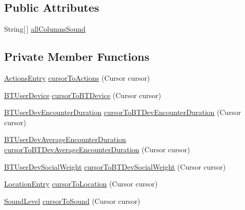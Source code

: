 \subsection*{Public Attributes}
\begin{DoxyCompactItemize}
\item 
String\mbox{[}$\,$\mbox{]} \hyperlink{classcs_1_1nsense_1_1db_1_1_n_sense_data_source_a512871cef56b7d4613d79f722aa60593}{all\-Columns\-Sound}
\end{DoxyCompactItemize}
\subsection*{Private Member Functions}
\begin{DoxyCompactItemize}
\item 
\hyperlink{classcs_1_1nsense_1_1accelerometer_1_1_actions_entry}{Actions\-Entry} \hyperlink{classcs_1_1nsense_1_1db_1_1_n_sense_data_source_ad9a688659c808f6f0772d9b95fd4eb95}{cursor\-To\-Actions} (Cursor cursor)
\item 
\hyperlink{classcs_1_1nsense_1_1bluetooth_1_1_b_t_user_device}{B\-T\-User\-Device} \hyperlink{classcs_1_1nsense_1_1db_1_1_n_sense_data_source_a4e859b85a3b76c52e6d762ad37f96908}{cursor\-To\-B\-T\-Device} (Cursor cursor)
\item 
\hyperlink{classcs_1_1nsense_1_1bluetooth_1_1_b_t_user_dev_encounter_duration}{B\-T\-User\-Dev\-Encounter\-Duration} \hyperlink{classcs_1_1nsense_1_1db_1_1_n_sense_data_source_a9a80fa17315786a5c02e202078322b95}{cursor\-To\-B\-T\-Dev\-Encounter\-Duration} (Cursor cursor)
\item 
\hyperlink{classcs_1_1nsense_1_1bluetooth_1_1_b_t_user_dev_average_encounter_duration}{B\-T\-User\-Dev\-Average\-Encounter\-Duration} \hyperlink{classcs_1_1nsense_1_1db_1_1_n_sense_data_source_a3652b86f815d0f9571dac1cc500164b0}{cursor\-To\-B\-T\-Dev\-Average\-Encounter\-Duration} (Cursor cursor)
\item 
\hyperlink{classcs_1_1nsense_1_1bluetooth_1_1_b_t_user_dev_social_weight}{B\-T\-User\-Dev\-Social\-Weight} \hyperlink{classcs_1_1nsense_1_1db_1_1_n_sense_data_source_a2e2b5c2b588600480bf06f274a7ab6d3}{cursor\-To\-B\-T\-Dev\-Social\-Weight} (Cursor cursor)
\item 
\hyperlink{classcs_1_1nsense_1_1location_1_1_location_entry}{Location\-Entry} \hyperlink{classcs_1_1nsense_1_1db_1_1_n_sense_data_source_a2a2d822324aea74a085b9c1ff44be57c}{cursor\-To\-Location} (Cursor cursor)
\item 
\hyperlink{classcs_1_1nsense_1_1microphone_1_1_sound_level}{Sound\-Level} \hyperlink{classcs_1_1nsense_1_1db_1_1_n_sense_data_source_a67ccacc89629ec664d1f0b8dc64c7e9e}{cursor\-To\-Sound} (Cursor cursor)
\end{DoxyCompactItemize}
